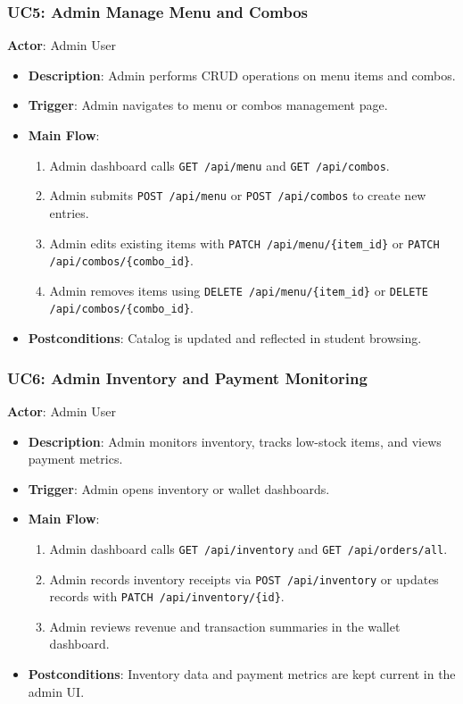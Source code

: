 \subsubsection{UC5: Admin Manage Menu and Combos}
\textbf{Actor}: Admin User
\begin{itemize}[nosep]
  \item \textbf{Description}: Admin performs CRUD operations on menu items and combos.
  \item \textbf{Trigger}: Admin navigates to menu or combos management page.
  \item \textbf{Main Flow}:
    \begin{enumerate}[nosep]
      \item Admin dashboard calls \texttt{GET /api/menu} and \texttt{GET /api/combos}.
      \item Admin submits \texttt{POST /api/menu} or \texttt{POST /api/combos} to create new entries.
      \item Admin edits existing items with \texttt{PATCH /api/menu/\{item\_id\}} or \texttt{PATCH /api/combos/\{combo\_id\}}.
      \item Admin removes items using \texttt{DELETE /api/menu/\{item\_id\}} or \texttt{DELETE /api/combos/\{combo\_id\}}.
    \end{enumerate}
  \item \textbf{Postconditions}: Catalog is updated and reflected in student browsing.
\end{itemize}

\subsubsection{UC6: Admin Inventory and Payment Monitoring}
\textbf{Actor}: Admin User
\begin{itemize}[nosep]
  \item \textbf{Description}: Admin monitors inventory, tracks low-stock items, and views payment metrics.
  \item \textbf{Trigger}: Admin opens inventory or wallet dashboards.
  \item \textbf{Main Flow}:
    \begin{enumerate}[nosep]
      \item Admin dashboard calls \texttt{GET /api/inventory} and \texttt{GET /api/orders/all}.
      \item Admin records inventory receipts via \texttt{POST /api/inventory} or updates records with \texttt{PATCH /api/inventory/\{id\}}.
      \item Admin reviews revenue and transaction summaries in the wallet dashboard.
    \end{enumerate}
  \item \textbf{Postconditions}: Inventory data and payment metrics are kept current in the admin UI.
\end{itemize}
